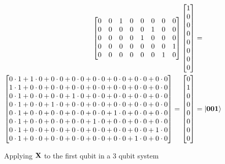 \begin{figure}[H]
\begin{align*}
\begin{bmatrix}
            0 & 0 & 1 & 0 & 0 & 0 & 0 & 0\\
            0 & 0 & 0 & 0 & 0 & 1 & 0 & 0\\
            0 & 0 & 0 & 0 & 1 & 0 & 0 & 0\\
            0 & 0 & 0 & 0 & 0 & 0 & 0 & 1\\
            0 & 0 & 0 & 0 & 0 & 0 & 1 & 0\\
        \end{bmatrix}
        \begin{bmatrix}
            1\\
            0\\
            0\\
            0\\
            0\\
            0\\
            0\\
            0
        \end{bmatrix}
        &=\\
        \begin{bmatrix}
            0\cdot 1 + 1\cdot 0 + 0\cdot 0 + 0\cdot 0 + 0\cdot 0 + 0\cdot 0 + 0\cdot 0 + 0\cdot 0\\
            1\cdot 1 + 0\cdot 0 + 0\cdot 0 + 0\cdot 0 + 0\cdot 0 + 0\cdot 0 + 0\cdot 0 + 0\cdot 0\\
            0\cdot 1 + 0\cdot 0 + 0\cdot 0 + 1\cdot 0 + 0\cdot 0 + 0\cdot 0 + 0\cdot 0 + 0\cdot 0\\
            0\cdot 1 + 0\cdot 0 + 1\cdot 0 + 0\cdot 0 + 0\cdot 0 + 0\cdot 0 + 0\cdot 0 + 0\cdot 0\\
            0\cdot 1 + 0\cdot 0 + 0\cdot 0 + 0\cdot 0 + 0\cdot 0 + 1\cdot 0 + 0\cdot 0 + 0\cdot 0\\
            0\cdot 1 + 0\cdot 0 + 0\cdot 0 + 0\cdot 0 + 1\cdot 0 + 0\cdot 0 + 0\cdot 0 + 0\cdot 0\\
            0\cdot 1 + 0\cdot 0 + 0\cdot 0 + 0\cdot 0 + 0\cdot 0 + 0\cdot 0 + 0\cdot 0 + 1\cdot 0\\
            0\cdot 1 + 0\cdot 0 + 0\cdot 0 + 0\cdot 0 + 0\cdot 0 + 0\cdot 0 + 1\cdot 0 + 0\cdot 0\\
        \end{bmatrix}
        =
        \begin{bmatrix}
            0\\
            1\\
            0\\
            0\\
            0\\
            0\\
            0\\
            0
        \end{bmatrix}
        &=
        \ket{\mathbf{0}\mathbf{0}\mathbf{1}}\\
    \end{align*}
    \caption{Applying $\mathbf{X}$ to the first qubit in a 3 qubit system}
    \label{fig:individual_application1}
\end{figure}


